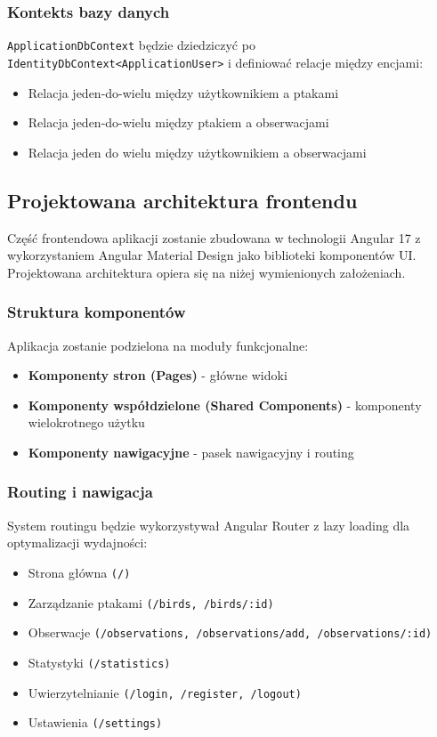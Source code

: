 \subsubsection{Kontekts bazy danych}
\texttt{ApplicationDbContext} będzie dziedziczyć po \texttt{IdentityDbContext<ApplicationUser>} i definiować relacje między encjami:
\begin{itemize}
	\item Relacja jeden-do-wielu między użytkownikiem a ptakami
	\item Relacja jeden-do-wielu między ptakiem a obserwacjami
	\item Relacja jeden do wielu między użytkownikiem a obserwacjami
\end{itemize}

\subsection{Projektowana architektura frontendu}
Część frontendowa aplikacji zostanie zbudowana w technologii Angular 17 z wykorzystaniem Angular Material Design jako biblioteki komponentów UI. Projektowana architektura opiera się na niżej wymienionych założeniach.

\subsubsection{Struktura komponentów}
Aplikacja zostanie podzielona na moduły funkcjonalne:
\begin{itemize}
	\item \textbf{Komponenty stron (Pages)} - główne widoki
	\item \textbf{Komponenty współdzielone (Shared Components)} - komponenty wielokrotnego użytku
	\item \textbf{Komponenty nawigacyjne} - pasek nawigacyjny i routing
\end{itemize}

\subsubsection{Routing i nawigacja}
System routingu będzie wykorzystywał Angular Router z lazy loading dla optymalizacji wydajności:
\begin{itemize}
	\item Strona główna \texttt{(/)}
	\item Zarządzanie ptakami \texttt{(/birds, /birds/:id)}
	\item Obserwacje \texttt{(/observations, /observations/add, /observations/:id)}
	\item Statystyki \texttt{(/statistics)}
	\item Uwierzytelnianie \texttt{(/login, /register, /logout)}
	\item Ustawienia \texttt{(/settings)}
\end{itemize}

